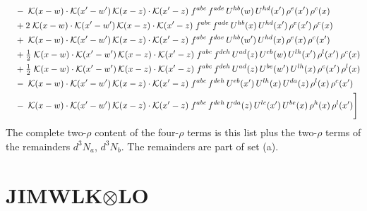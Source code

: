 \documentclass[10pt]{article}
\numberwithin{equation}{section}
\begin{document}
\begin{align}
&\quad -\;\mathcal{K}(x-w)\cdot\mathcal{K}(x'-w')\,\mathcal{K}(x-z)\cdot\mathcal{K}(x'-z)\;f^{abc}\,f^{ade}\,U^{hb}(w)\,U^{hd}(x')\,\rho^{e}(x')\,\rho^{c}(x)\notag\\
&\quad +2\;\mathcal{K}(x-w)\cdot\mathcal{K}(x'-w')\,\mathcal{K}(x-z)\cdot\mathcal{K}(x'-z)\;f^{abc}\,f^{ade}\,U^{hb}(x)\,U^{hd}(x')\,\rho^{e}(x')\,\rho^{c}(x)\notag\\
&\quad +\;\mathcal{K}(x-w)\cdot\mathcal{K}(x'-w')\,\mathcal{K}(x-z)\cdot\mathcal{K}(x'-z)\;f^{abc}\,f^{dae}\,U^{hb}(w')\,U^{hd}(x)\,\rho^{e}(x)\,\rho^{c}(x')\notag\\
&\quad +\tfrac{1}{2}\;\mathcal{K}(x-w)\cdot\mathcal{K}(x'-w')\,\mathcal{K}(x-z)\cdot\mathcal{K}(x'-z)\;f^{abc}\,f^{deh}\,U^{ad}(z)\,U^{eb}(w)\,U^{lh}(x')\,\rho^{l}(x')\,\rho^{c}(x)\notag\\
&\quad +\tfrac{1}{2}\;\mathcal{K}(x-w)\cdot\mathcal{K}(x'-w')\,\mathcal{K}(x-z)\cdot\mathcal{K}(x'-z)\;f^{abc}\,f^{deh}\,U^{ad}(z)\,U^{be}(w')\,U^{lh}(x)\,\rho^{c}(x')\,\rho^{l}(x)\notag\\
&\quad -\;\mathcal{K}(x-w)\cdot\mathcal{K}(x'-w')\,\mathcal{K}(x-z)\cdot\mathcal{K}(x'-z)\;f^{abc}\,f^{deh}\,U^{eb}(x')\,U^{lh}(x)\,U^{da}(z)\,\rho^{l}(x)\,\rho^{c}(x')\notag\\
&\quad -\;\mathcal{K}(x-w)\cdot\mathcal{K}(x'-w')\,\mathcal{K}(x-z)\cdot\mathcal{K}(x'-z)\;f^{abc}\,f^{deh}\,U^{da}(z)\,U^{lc}(x')\,U^{be}(x)\,\rho^{h}(x)\,\rho^{l}(x')\Bigg]\label{eq:four}
\end{align}
The complete two-$\rho$ content of the four-$\rho$ terms is this list plus the two-$\rho$ terms of the remainders $d^3N_a$, $d^3N_b$. The remainders are part of set (a).

\section{JIMWLK\texorpdfstring{$\otimes$}{x}LO}\label{sec:J}
\end{document}
